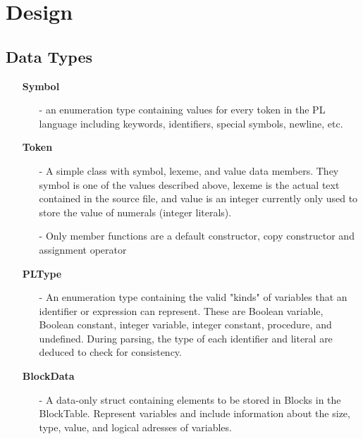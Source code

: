\documentclass{article}
\begin{document}
\section{Design}

\subsection*{Data Types}

\begin{itemize}
    \item[] \textbf{Symbol}
        \begin{itemize}
            \item[-] an enumeration type containing values for every  token in the PL language including keywords, identifiers, special symbols, newline, etc.
        \end{itemize} 
    \item[] \textbf{Token} 
        \begin{itemize}
            \item[-] A simple class with symbol, lexeme, and value data members. They symbol is one of the values described above, lexeme is the actual text contained in the source file, and value is an integer currently only used to store the value of numerals (integer literals).
        \item[-] Only member functions are a default constructor, copy constructor and assignment operator 
        \end{itemize} 
    \item[] \textbf{PLType}
        \begin{itemize}
            \item[-] An enumeration type containing the valid "kinds" of variables that an identifier or expression can represent. These are Boolean variable, Boolean constant, integer variable, integer constant, procedure, and undefined. During parsing, the type of each identifier and literal are deduced to check for consistency.
        \end{itemize}
    \item[] \textbf{BlockData}
        \begin{itemize}
            \item[-] A data-only struct containing elements to be stored in Blocks in the BlockTable. Represent variables and include information about the size, type, value, and logical adresses of variables.
        \end{itemize}
\end{itemize}
\end{document}
